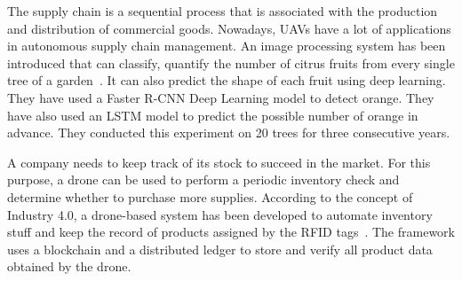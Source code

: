 The supply chain is a sequential process that is associated with the production and distribution of commercial goods. Nowadays, UAVs have a lot of applications in autonomous supply chain management. An image processing system has been introduced that can classify, quantify the number of citrus fruits from every single tree of a garden~\cite{apolo2020deep}. It can also predict the shape of each fruit using deep learning. They have used a Faster R-CNN Deep Learning model to detect orange. They have also used an LSTM model to predict the possible number of orange in advance. They conducted this experiment on 20 trees for three consecutive years.

A company needs to keep track of its stock to succeed in the market. For this purpose, a drone can be used to perform a periodic inventory check and determine whether to purchase more supplies. According to the concept of Industry 4.0, a drone-based system has been developed to automate inventory stuff and keep the record of products assigned by the RFID tags~\cite{fernandez2019towards}. The framework uses a blockchain and a distributed ledger to store and verify all product data obtained by the drone. 